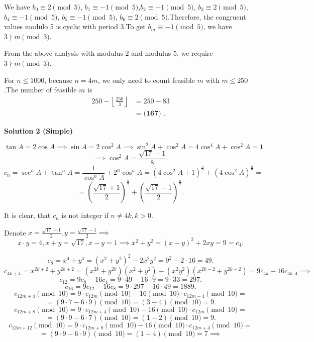 \begin{enumerate}
 We have $b_0 \equiv 2 \pmod{5}$, $b_1 \equiv -1 \pmod{5}$,$b_2 \equiv -1 \pmod{5}$, $b_3 \equiv 2 \pmod{5}$, $b_4 \equiv -1 \pmod{5}$, $b_5 \equiv -1 \pmod{5}$, $b_6 \equiv 2 \pmod{5}$.Therefore, the congruent values modulo 5 is cyclic with period 3.To get $b_m \equiv -1 \pmod{5}$, we have $3 \nmid m \pmod{3}$.

 From the above analysis with modulus 2 and modulus 5, we require $3 \nmid m \pmod{3}$.

 For $n \leq 1000$, because $n = 4m$, we only need to count feasible $m$ with $m \leq 250$.The number of feasible $m$ is
 \begin{align*} 250 - \left\lfloor \frac{250}{3} \right\rfloor & = 250 - 83 \\ & = \boxed{\textbf{(167) }} . \end{align*}





\textbf{Solution 2 (Simple)}


 \[\tan A = 2 \cos A \implies \sin A = 2 \cos^2 A \implies  \sin^2 A + \cos^2 A = 4  \cos^4 A + \cos^2 A = 1\]
 \[\implies   \cos^2 A = \frac {\sqrt {17} - 1}{8}.\]
 \[c_n = \sec^n A + \tan^n A = \frac {1}{\cos^n A} + 2^n \cos^n A = (4\cos^2 A +1)^{\frac {n}{2}}+(4 \cos^2 A)^{\frac {n}{2}} =\]
 \[= \left(\frac {\sqrt {17} + 1}{2}\right)^{\frac {n}{2}}+ \left(\frac {\sqrt {17} - 1}{2}\right)^{\frac {n}{2}}.\]

 It is clear, that $c_n$ is not integer if $n \ne 4k, k > 0.$

 Denote $x = \frac {\sqrt {17} + 1}{2}, y = \frac {\sqrt {17} - 1}{2} \implies$
 \[x \cdot y = 4, x + y = \sqrt{17}, x - y = 1 \implies x^2 + y^2 = (x - y)^2 + 2xy = 9 = c_4.\]

 \[c_8 = x^4 + y^4 = (x^2 + y^2)^2 - 2x^2 y^2 = 9^2 - 2 \cdot 16 = 49.\]
 \[c_{4k+4} = x^{2k+2} + y^{2k+2} = (x^{2k} + y^{2k})(x^2+y^2)- (x^2 y^2)(x^{2k-2}+y^{2k-2}) = 9 c_{4k}- 16 c_{4k – 4} \implies\]
 \[c_{12} = 9 c_8 - 16 c_4 = 9 \cdot 49 - 16 \cdot 9 = 9 \cdot 33 = 297.\]
 \[c_{16} = 9 c_{12} - 16 c_8 = 9 \cdot 297 - 16 \cdot 49 = 1889.\]
 \[c_{12m + 4} \pmod{10} = 9 \cdot c_{12m} \pmod{10} - 16 \pmod{10} \cdot c_{12m - 4}  \pmod{10} =\]
 \[= (9 \cdot 7 - 6 \cdot 9)  \pmod{10} = (3 - 4)  \pmod{10} = 9.\]
 \[c_{12m + 8}\pmod{10} = 9 \cdot c_{12m+4} \pmod{10} - 16 \pmod{10} \cdot c_{12m } \pmod{10} =\]
 \[= (9 \cdot 9 - 6 \cdot 7) \pmod{10} = (1 - 2)\pmod{10} = 9.\]
 \[c_{12m + 12} \pmod{10} = 9 \cdot c_{12m + 8} \pmod{10} - 16 \pmod{10} \cdot c_{12m + 4} \pmod{10} =\]
 \[= (9 \cdot 9 - 6 \cdot 9) \pmod{10} = (1 - 4) \pmod{10} = 7 \implies\]


\end{enumerate}
